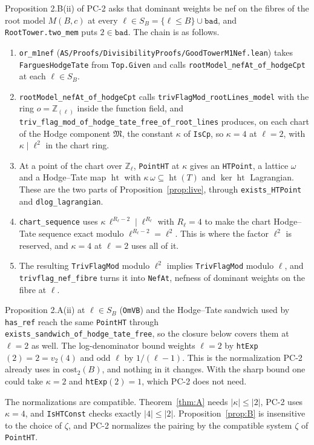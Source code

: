 \documentclass[11pt]{article}
\newcommand{\lean}[1]{\nolinkurl{#1}}
\theoremstyle{definition}
\theoremstyle{remark}
\begin{document}
Proposition 2.B(ii) of PC-2 asks that dominant weights be nef on the fibres of the root model $M(B,c)$ at every $\ell\in S_B=\{\ell\le B\}\cup\texttt{bad}$, and \lean{RootTower.two_mem} puts $2\in\texttt{bad}$. The chain is as follows.
\begin{enumerate}[nosep]
\item \lean{or_m1nef} (\texttt{AS/Proofs/DivisibilityProofs/GoodTowerM1Nef.lean}) takes \lean{FarguesHodgeTate} from \lean{Top.Given} and calls \lean{rootModel_nefAt_of_hodgeCpt} at each $\ell\in S_B$.
\item \lean{rootModel_nefAt_of_hodgeCpt} calls \lean{trivFlagMod_rootLines_model} with the ring $o=\mathbb Z_{(\ell)}$ inside the function field, and \lean{triv_flag_mod_of_hodge_tate_free_of_root_lines} produces, on each chart of the Hodge component $\mathfrak M$, the constant $\kappa$ of \lean{IsCp}, so $\kappa=4$ at $\ell=2$, with $\kappa\mid\ell^2$ in the chart ring.
\item At a point of the chart over $\mathbb Z_\ell$, \lean{PointHT} at $\kappa$ gives an \lean{HTPoint}, a lattice $\omega$ and a Hodge--Tate map $\operatorname{ht}$ with $\kappa\,\omega\subseteq\operatorname{ht}(T)$ and $\ker\operatorname{ht}$ Lagrangian. These are the two parts of Proposition~\ref{prop:live}, through \lean{exists_HTPoint} and \lean{dlog_lagrangian}.
\item \lean{chart_sequence} uses $\kappa\,\ell^{R_\ell-2}\mid\ell^{R_\ell}$ with $R_\ell=4$ to make the chart Hodge--Tate sequence exact modulo $\ell^{R_\ell-2}=\ell^2$. This is where the factor $\ell^2$ is reserved, and $\kappa=4$ at $\ell=2$ uses all of it.
\item The resulting \lean{TrivFlagMod} modulo $\ell^2$ implies \lean{TrivFlagMod} modulo $\ell$, and \lean{trivflag_nef_fibre} turns it into \lean{NefAt}, nefness of dominant weights on the fibre at $\ell$.
\end{enumerate}

Proposition 2.A(ii) at $\ell\in S_B$ (\lean{OmVB}) and the Hodge--Tate sandwich used by \lean{has_ref} reach the same \lean{PointHT} through \lean{exists_sandwich_of_hodge_tate_free}, so the closure below covers them at $\ell=2$ as well. The log-denominator bound weights $\ell=2$ by \lean{htExp}$(2)=2=v_2(4)$ and odd $\ell$ by $1/(\ell-1)$. This is the normalization PC-2 already uses in $\mathrm{cost}_2(B)$, and nothing in it changes. With the sharp bound one could take $\kappa=2$ and \lean{htExp}$(2)=1$, which PC-2 does not need.

The normalizations are compatible. Theorem~\ref{thm:A} needs $\lvert\kappa\rvert\le\lvert2\rvert$, PC-2 uses $\kappa=4$, and \lean{IsHTConst} checks exactly $\lvert4\rvert\le\lvert2\rvert$. Proposition~\ref{prop:B} is insensitive to the choice of $\zeta$, and PC-2 normalizes the pairing by the compatible system $\zeta$ of \lean{PointHT}.
\end{document}
